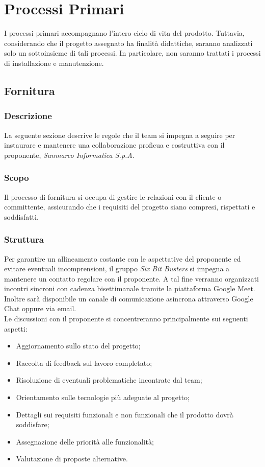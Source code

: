 \section{Processi Primari}
I processi primari accompagnano l'intero ciclo di vita del prodotto. 
Tuttavia, considerando che il progetto assegnato ha finalità didattiche, saranno analizzati solo un sottoinsieme di tali processi. 
In particolare, non saranno trattati i processi di installazione e manutenzione.

\subsection{Fornitura}
\subsubsection{Descrizione}
La seguente sezione descrive le regole che il team si impegna a seguire per
instaurare e mantenere una collaborazione proficua e costruttiva con il
proponente, \textit{Sanmarco Informatica S.p.A.}

\subsubsection{Scopo}
Il processo di fornitura si occupa di gestire le
relazioni con il cliente o committente, assicurando che i requisiti del
progetto siano compresi, rispettati e soddisfatti.

\subsubsection{Struttura}
Per garantire un allineamento costante con le aspettative del proponente ed
evitare eventuali incomprensioni, il gruppo \textit{Six Bit Busters} si impegna
a mantenere un contatto regolare con il proponente. A tal fine verranno
organizzati incontri sincroni con cadenza bisettimanale tramite la piattaforma
Google Meet. Inoltre sarà disponibile un canale di comunicazione asincrona
attraverso Google Chat oppure via email.\\

\noindent Le discussioni con il proponente si concentreranno principalmente sui seguenti
aspetti:

\begin{itemize}
    \item Aggiornamento sullo stato del progetto;
    \item Raccolta di feedback sul lavoro completato;
    \item Risoluzione di eventuali problematiche incontrate dal team;
    \item Orientamento sulle tecnologie più adeguate al progetto;
    \item Dettagli sui requisiti funzionali e non funzionali che il prodotto dovrà
          soddisfare;
    \item Assegnazione delle priorità alle funzionalità;
    \item Valutazione di proposte alternative.
\end{itemize}

